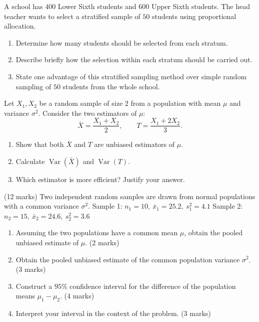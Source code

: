 \documentclass[11pt]{article}
\newcounter{popsec}
\newcounter{popsub}
\newcommand{\courssub}[1]{%
  \stepcounter{popsub}%
  \par\vspace{9pt}\noindent{\popxbold\fontsize{11.5}{13}\selectfont\color{popink}{\color{poporange}\thepopsec.\thepopsub}\hspace{6pt}#1}\par\nopagebreak\vspace{4pt}
}
\begin{document}
\begin{exercice}
A school has $400$ Lower Sixth students and $600$ Upper Sixth students. The head teacher wants to select a stratified sample of $50$ students using proportional allocation.
\begin{enumerate}
\item Determine how many students should be selected from each stratum.
\item Describe briefly how the selection within each stratum should be carried out.
\item State one advantage of this stratified sampling method over simple random sampling of $50$ students from the whole school.
\end{enumerate}
\end{exercice}

\begin{exercice}
Let $X_1, X_2$ be a random sample of size $2$ from a population with mean $\mu$ and variance $\sigma^2$. Consider the two estimators of $\mu$:
\[
\bar{X} = \frac{X_1 + X_2}{2}, \qquad T = \frac{X_1 + 2X_2}{3}.
\]
\begin{enumerate}
\item Show that both $\bar{X}$ and $T$ are unbiased estimators of $\mu$.
\item Calculate $\operatorname{Var}(\bar{X})$ and $\operatorname{Var}(T)$.
\item Which estimator is more efficient? Justify your answer.
\end{enumerate}
\end{exercice}

\courssub{I prepare for the GCE}

\begin{exercice} \hfill (12 marks)
Two independent random samples are drawn from normal populations with a common variance $\sigma^2$.
Sample 1: $n_1 = 10,\ \bar{x}_1 = 25.2,\ s_1^2 = 4.1$
Sample 2: $n_2 = 15,\ \bar{x}_2 = 24.6,\ s_2^2 = 3.6$
\begin{enumerate}
\item Assuming the two populations have a common mean $\mu$, obtain the pooled unbiased estimate of $\mu$. \hfill (2 marks)
\item Obtain the pooled unbiased estimate of the common population variance $\sigma^2$. \hfill (3 marks)
\item Construct a $95\%$ confidence interval for the difference of the population means $\mu_1 - \mu_2$. \hfill (4 marks)
\item Interpret your interval in the context of the problem. \hfill (3 marks)
\end{enumerate}
\end{exercice}
\end{document}
